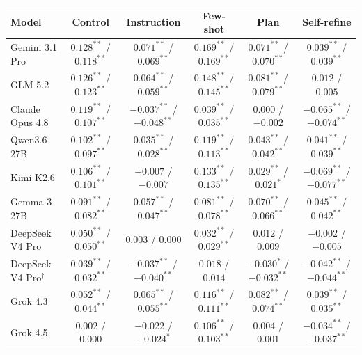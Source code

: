 \begin{tabular}{lccccc}
\toprule
Model & Control & Instruction & Few-shot & Plan & Self-refine \\
\midrule
Gemini 3.1 Pro & $0.128^{**}$ / $0.118^{**}$ & $0.071^{**}$ / $0.069^{**}$ & $0.169^{**}$ / $0.169^{**}$ & $0.071^{**}$ / $0.070^{**}$ & $0.039^{**}$ / $0.039^{**}$ \\
GLM-5.2 & $0.126^{**}$ / $0.123^{**}$ & $0.064^{**}$ / $0.059^{**}$ & $0.148^{**}$ / $0.145^{**}$ & $0.081^{**}$ / $0.079^{**}$ & $0.012$ / $0.005$ \\
Claude Opus 4.8 & $0.119^{**}$ / $0.107^{**}$ & $-0.037^{**}$ / $-0.048^{**}$ & $0.039^{**}$ / $0.035^{**}$ & $0.000$ / $-0.002$ & $-0.065^{**}$ / $-0.074^{**}$ \\
Qwen3.6-27B & $0.102^{**}$ / $0.097^{**}$ & $0.035^{**}$ / $0.028^{**}$ & $0.119^{**}$ / $0.113^{**}$ & $0.043^{**}$ / $0.042^{**}$ & $0.041^{**}$ / $0.039^{**}$ \\
Kimi K2.6 & $0.106^{**}$ / $0.101^{**}$ & $-0.007$ / $-0.007$ & $0.133^{**}$ / $0.135^{**}$ & $0.029^{**}$ / $0.021^{*}$ & $-0.069^{**}$ / $-0.077^{**}$ \\
Gemma 3 27B & $0.091^{**}$ / $0.082^{**}$ & $0.057^{**}$ / $0.047^{**}$ & $0.081^{**}$ / $0.078^{**}$ & $0.070^{**}$ / $0.066^{**}$ & $0.045^{**}$ / $0.042^{**}$ \\
DeepSeek V4 Pro & $0.050^{**}$ / $0.050^{**}$ & $0.003$ / $0.000$ & $0.032^{**}$ / $0.029^{**}$ & $0.012$ / $0.009$ & $-0.002$ / $-0.005$ \\
DeepSeek V4 Pro$^{\dagger}$ & $0.039^{**}$ / $0.032^{**}$ & $-0.037^{**}$ / $-0.040^{**}$ & $0.018$ / $0.014$ & $-0.030^{*}$ / $-0.032^{**}$ & $-0.042^{**}$ / $-0.044^{**}$ \\
Grok 4.3 & $0.052^{**}$ / $0.044^{**}$ & $0.065^{**}$ / $0.055^{**}$ & $0.116^{**}$ / $0.111^{**}$ & $0.082^{**}$ / $0.074^{**}$ & $0.039^{**}$ / $0.035^{**}$ \\
Grok 4.5 & $0.002$ / $0.000$ & $-0.022$ / $-0.024^{*}$ & $0.106^{**}$ / $0.103^{**}$ & $0.004$ / $0.001$ & $-0.034^{**}$ / $-0.037^{**}$ \\
\bottomrule
\end{tabular}
